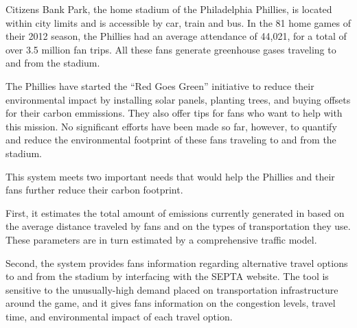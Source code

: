 
Citizens Bank Park, the home stadium of the Philadelphia Phillies, is
located within city limits and is accessible by car, train and bus. In
the 81 home games of their 2012 season, the Phillies had an average
attendance of 44,021, for a total of over 3.5 million fan trips. All
these fans generate greenhouse gases traveling to and from the
stadium.

The Phillies have started the ``Red Goes Green'' initiative to reduce
their environmental impact by installing solar panels, planting trees,
and buying offsets for their carbon emmissions. They also offer tips
for fans who want to help with this mission.  No significant efforts
have been made so far, however, to quantify and reduce the
environmental footprint of these fans traveling to and from the
stadium.

This system meets two important needs that would help the Phillies and
their fans further reduce their carbon footprint.

First, it estimates the total amount of emissions currently generated
in based on the average distance traveled by fans and on the types of
transportation they use. These parameters are in turn estimated by a
comprehensive traffic model.

Second, the system provides fans information regarding alternative
travel options to and from the stadium by interfacing with the SEPTA
website. The tool is sensitive to the unusually-high demand placed on
transportation infrastructure around the game, and it gives fans
information on the congestion levels, travel time, and environmental
impact of each travel option.
